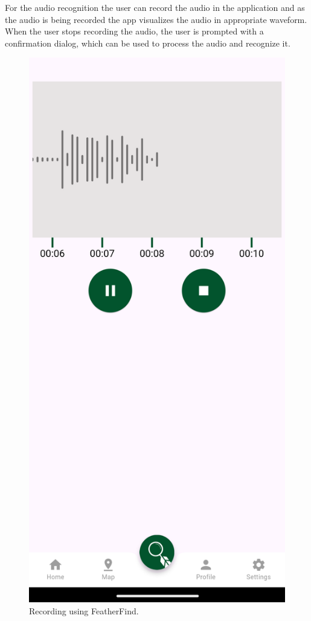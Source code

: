 For the audio recognition the user can record the audio in the application and as the 
audio is being recorded the app visualizes the audio in appropriate waveform. When the user stops
recording the audio, the user is prompted with a confirmation dialog, which can be used to process the 
audio and recognize it.
\begin{figure}[h!]
    \centering
    \includegraphics[scale=0.18]{images/recording.png}
    \caption{Recording using FeatherFind.}
\end{figure}

